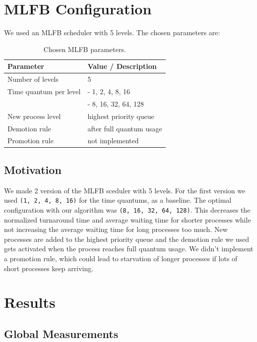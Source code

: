 \documentclass[a4paper,11pt]{article}
\begin{document}
\section{MLFB Configuration}

We used an MLFB scheduler with 5 levels. The chosen parameters are:

\begin{table}[H]
    \centering
    \begin{tabular}{@{}ll@{}}
        \toprule
        Parameter & Value / Description \\
        \midrule
        Number of levels & 5 \\
        Time quantum per level & - 1, 2, 4, 8, 16 \\ & - 8, 16, 32, 64, 128 \\
        New process level & highest priority queue \\
        Demotion rule & after full quantum usage \\
        Promotion rule & not implemented \\
        \bottomrule
    \end{tabular}
    \caption{Chosen MLFB parameters.}
    \label{tab:mlfb}
\end{table}

\subsection{Motivation}
We made 2 version of the MLFB sceduler with 5 levels.
For the first version we used \texttt{(1, 2, 4, 8, 16)} for the time quantums, as a baseline.
The optimal configuration with our algorithm was \texttt{(8, 16, 32, 64, 128)}.
This decreases the normalized turnaround time and average waiting time for shorter processes 
while not increasing the average waiting time for long processes too much.
New processes are added to the highest priority queue and the demotion rule we used gets activated when the process reaches full quantum usage.
We didn't implement a promotion rule, which could lead to starvation of longer processes if lots of short processes keep arriving.

\section{Results}

\subsection{Global Measurements}
\end{document}
